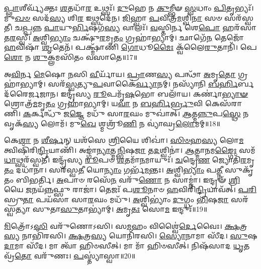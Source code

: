 \-\ul{𑌪𑍍𑌲𑌾}\-𑌶𑍀𑌰𑍍𑌵𑍍𑌯᳴𑌕𑍍𑌤𑌃 \ul{𑌶}\-𑌤𑌧𑌾᳴\-\ul{𑌰} 𑌉𑌥𑍍𑌸𑌃᳴।
\-\ul{𑌦𑍁}\-𑌹𑍇 𑌨 \ul{𑌕𑍁}\-𑌮𑍍𑌭𑍀𑍟 \ul{𑌸𑍍𑌵}\-𑌧𑌾𑌂 \ul{𑌪𑌿}\-𑌤𑍃𑌭𑍍𑌯𑌃᳴।
𑌮𑍁\-\ul{𑌖}\-\-\ul{𑍞} 𑌸𑌦᳴\-\ul{𑌸𑍍𑌯} 𑌶𑌿\-\ul{𑌰} 𑌇𑌥𑍍𑌸𑌦𑍇᳴𑌨।
\-\ul{𑌜𑌿}\-𑌹𑍍𑌵𑌾 \ul{𑌪}\-𑌵𑌿𑌤𑍍𑌰᳴\-\ul{𑌮}\-𑌶𑍍𑌵𑌿\-\ul{𑌨𑌾} 𑌸𑍞 𑌸𑌰᳴𑌸𑍍𑌵𑌤𑍀।
𑌚\-\ul{𑌪𑍍𑌪}\-𑌨𑍍𑌨 \ul{𑌪𑌾}\-𑌯𑍁\-\ul{𑌰𑍍𑌭𑌿}\-𑌷𑌗᳴\-\ul{𑌸𑍍𑌯} 𑌵𑌾𑌲𑌃᳴।
\-\ul{𑌵}\-𑌸𑍍𑌤𑌿𑌰𑍍𑌨 𑌶𑍇\-\ul{𑌪𑍋} 𑌹𑌰᳴𑌸𑌾 𑌤\-\ul{𑌰}\-𑌸𑍍𑌵𑍀।
\-\ul{𑌅}\-𑌶𑍍𑌵𑌿\-\ul{𑌭𑍍𑌯𑌾𑌂} 𑌚𑌕𑍍𑌷𑍁᳴\-\ul{𑌰}\-𑌮𑍃\-\ul{𑌤𑌂} 𑌗𑍍𑌰𑌹𑌾॑𑌭𑍍𑌯𑌾𑌮𑍍।
𑌛𑌾𑌗𑍇᳴\-\ul{𑌨} 𑌤𑍇𑌜𑍋᳴ \ul{𑌹}\-𑌵𑌿𑌷𑌾᳴ \ul{𑌶𑍃}\-𑌤𑍇𑌨᳴।
𑌪𑌕𑍍𑌷𑍍𑌮𑌾᳴𑌣𑌿 \ul{𑌗𑍋}\-𑌧𑍂\-\ul{𑌮𑍈𑌃} 𑌕𑍍𑌵᳴𑌲𑍈\-\ul{𑌰𑍁}\-𑌤𑌾𑌨𑌿᳴।
𑌪𑍇\-\ul{𑌶𑍋} 𑌨 \ul{𑌶𑍁}\-𑌕𑍍𑌲𑌮𑌸𑌿᳴𑌤𑌂 𑌵𑌸𑌾𑌤𑍇॥17॥

𑌅\-\ul{𑌵𑌿}\-𑌰𑍍𑌨 \ul{𑌮𑍇}\-𑌷𑍋 \ul{𑌨}\-𑌸𑌿 \ul{𑌵𑍀}\-𑌰𑍍𑌯𑌾᳴𑌯।
\-\ul{𑌪𑍍𑌰𑌾}\-𑌣\-\ul{𑌸𑍍𑌯} 𑌪𑌨𑍍𑌥𑌾᳴ \ul{𑌅}\-𑌮𑍃\-\ul{𑌤𑍋} 𑌗𑍍𑌰𑌹𑌾॑𑌭𑍍𑌯𑌾𑌮𑍍।
𑌸𑌰᳴\-\ul{𑌸𑍍𑌵}\-𑌤𑍍𑌯𑍁\-\ul{𑌪}\-𑌵𑌾𑌕𑍈॑\-\ul{𑌰𑍍𑌵𑍍𑌯𑌾}\-𑌨𑌮𑍍।
𑌨𑌸𑍍𑌯𑌾᳴𑌨𑌿 \ul{𑌬}\-\-\ul{𑌰𑍍}\-𑌹𑌿𑌰𑍍𑌬𑌦᳴𑌰𑍈𑌰𑍍𑌜𑌜𑌾𑌨।
𑌇𑌨𑍍𑌦𑍍𑌰᳴𑌸𑍍𑌯 \ul{𑌰𑍂}\-𑌪𑌮𑍃᳴\-\ul{𑌷}\-𑌭𑍋 𑌬𑌲𑌾᳴𑌯।
𑌕𑌰𑍍𑌣𑌾॑\-\ul{𑌭𑍍𑌯𑌾}\-\-\ul{𑍟} 𑌶𑍍𑌰𑍋𑌤𑍍𑌰᳴\-\ul{𑌮}\-𑌮𑍃\-\ul{𑌤𑌂} 𑌗𑍍𑌰𑌹𑌾॑𑌭𑍍𑌯𑌾𑌮𑍍।
𑌯\-\ul{𑌵𑌾} 𑌨 \ul{𑌬}\-\-\ul{𑌰𑍍}\-𑌹𑌿\-\ul{𑌰𑍍𑌭𑍍𑌰𑍁}\-𑌵𑌿 𑌕𑍇𑌸᳴𑌰𑌾𑌣𑌿।
\-\ul{𑌕}\-𑌰𑍍𑌕𑌨𑍍𑌧𑍁᳴ 𑌜\-\ul{𑌜𑍍𑌞𑍇} 𑌮𑌧𑍁᳴ 𑌸𑌾\-\ul{𑌰}\-𑌘𑌂 𑌮𑍁𑌖𑌾॑𑌤𑍍।
\-\ul{𑌆}\-𑌤𑍍𑌮\-\ul{𑌨𑍍𑌨𑍁}\-𑌪\-\ul{𑌸𑍍𑌥𑍇} 𑌨 𑌵𑍃𑌕᳴\-\ul{𑌸𑍍𑌯} 𑌲𑍋𑌮᳴।
𑌮𑍁\-\ul{𑌖𑍇} 𑌶𑍍𑌮𑌶𑍍𑌰𑍂᳴\-\ul{𑌣𑌿} 𑌨 𑌵𑍍𑌯𑌾॑𑌘𑍍𑌰\-\ul{𑌲𑍋}\-𑌮𑌮𑍍॥18॥

𑌕𑍇\-\ul{𑌶𑌾} 𑌨 \ul{𑌶𑍀}\-\-\ul{𑌰𑍍}\-𑌷𑌨𑍍‌ 𑌯𑌶᳴𑌸𑍇 \ul{𑌶𑍍𑌰𑌿}\-𑌯𑍈 𑌶𑌿𑌖𑌾॑।
\-\ul{𑌸𑌿}\-\-\ul{𑍞}\-𑌹\-\ul{𑌸𑍍𑌯} 𑌲𑍋\-\ul{𑌮} 𑌤𑍍𑌵𑌿𑌷𑌿᳴𑌰𑌿\-\ul{𑌨𑍍𑌦𑍍𑌰𑌿}\-𑌯𑌾𑌣𑌿᳴।
𑌅𑌙𑍍𑌗𑌾॑\-\ul{𑌨𑍍𑌯𑌾}\-𑌤𑍍𑌮\-\ul{𑌨𑍍𑌭𑌿}\-𑌷\-\ul{𑌜𑌾} 𑌤\-\ul{𑌦}\-𑌶𑍍𑌵𑌿𑌨𑌾॑।
\-\ul{𑌆}\-𑌤𑍍𑌮𑌾\-\ul{𑌨}\-𑌮\-\ul{𑌙𑍍𑌗𑍈𑌃} 𑌸𑌮᳴\-\ul{𑌧𑌾}\-𑌥𑍍𑌸𑌰᳴𑌸𑍍𑌵𑌤𑍀।
𑌇𑌨𑍍𑌦𑍍𑌰᳴𑌸𑍍𑌯 \ul{𑌰𑍂}\-𑌪𑍞 \ul{𑌶}\-𑌤𑌮𑌾᳴\-\ul{𑌨}\-𑌮𑌾𑌯𑍁𑌃᳴।
\-\ul{𑌚}\-𑌨𑍍𑌦𑍍𑌰𑍇\-\ul{𑌣} 𑌜𑍍𑌯𑍋𑌤𑌿᳴\-\ul{𑌰}\-𑌮𑍃\-\ul{𑌤𑌂} 𑌦𑌧𑌾᳴𑌨𑌾।
𑌸𑌰᳴𑌸𑍍𑌵\-\ul{𑌤𑍀} 𑌯𑍋\-\ul{𑌨𑍍𑌯𑌾𑌂} 𑌗𑌰𑍍𑌭᳴\-\ul{𑌮}\-𑌨𑍍𑌤𑌃।
\-\ul{𑌅}\-𑌶𑍍𑌵𑌿\-\ul{𑌭𑍍𑌯𑌾𑌂} 𑌪\-\ul{𑌤𑍍𑌨𑍀} 𑌸𑍁𑌕𑍃᳴𑌤𑌂 𑌬𑌿𑌭𑌰𑍍𑌤𑌿।
\-\ul{𑌅}\-𑌪𑌾𑍞 𑌰𑌸𑍇᳴\-\ul{𑌨} 𑌵𑌰𑍁᳴\-\ul{𑌣𑍋} 𑌨 𑌸𑌾𑌮𑍍𑌨𑌾॑।
𑌇𑌨𑍍𑌦𑍍𑌰𑍟᳴ \ul{𑌶𑍍𑌰𑌿}\-𑌯𑍈 \ul{𑌜}\-𑌨𑌯᳴\-\ul{𑌨𑍍𑌨}\-𑌫𑍍𑌸𑍁 𑌰𑌾𑌜𑌾॑।
𑌤𑍇𑌜𑌃᳴ 𑌪\-\ul{𑌶𑍂}\-𑌨𑌾𑍞 \ul{𑌹}\-𑌵𑌿𑌰𑌿᳴\-\ul{𑌨𑍍𑌦𑍍𑌰𑌿}\-𑌯𑌾𑌵᳴𑌤𑍍।
\-\ul{𑌪}\-\-\ul{𑌰𑌿}\-𑌸𑍍𑌰𑍁\-\ul{𑌤𑌾} 𑌪𑌯᳴𑌸𑌾 𑌸𑌾\-\ul{𑌰}\-𑌘𑌂 𑌮𑌧𑍁᳴।
\-\ul{𑌅}\-𑌶𑍍𑌵𑌿𑌭𑍍𑌯𑌾𑌂॑ \ul{𑌦𑍁}\-𑌗𑍍𑌧𑌂 \ul{𑌭𑌿}\-𑌷\-\ul{𑌜𑌾} 𑌸𑌰᳴𑌸𑍍𑌵𑌤𑍍𑌯𑌾 𑌸𑍁𑌤𑌾\-\ul{𑌸𑍁}\-𑌤𑌾𑌭𑍍𑌯𑌾॑𑌮𑍍।
\-\ul{𑌅}\-𑌮𑍃\-\ul{𑌤𑌃} 𑌸𑍋\-\ul{𑌮} 𑌇𑌨𑍍𑌦𑍁𑌃᳴॥19॥\anuvakamend[𑌅𑌨𑍍𑌤᳴𑌰 \ul{𑌆}\-𑌰𑌾\-\ul{𑌦}\-𑌨𑍍𑌤𑌰𑍍𑌵᳴𑌸𑌾𑌤𑍇 𑌵𑍍𑌯𑌾𑌘𑍍𑌰\-\ul{𑌲𑍋}\-𑌮𑍞 𑌰𑌾𑌜𑌾᳴ \ul{𑌚}\-𑌤𑍍𑌵𑌾𑌰𑌿᳴ 𑌚]

\-\ul{𑌮𑌿}\-𑌤𑍍𑌰𑍋᳴𑌽\-\ul{𑌸𑌿} 𑌵𑌰𑍁᳴𑌣𑍋𑌽𑌸𑌿।
𑌸\-\ul{𑌮}\-𑌹𑌂 𑌵𑌿𑌶𑍍𑌵𑍈॑\-\ul{𑌰𑍍𑌦𑍇}\-𑌵𑍈𑌃।
\-\ul{𑌕𑍍𑌷}\-𑌤𑍍𑌰\-\ul{𑌸𑍍𑌯} 𑌨𑌾𑌭𑌿᳴𑌰𑌸𑌿।
\-\ul{𑌕𑍍𑌷}\-𑌤𑍍𑌰\-\ul{𑌸𑍍𑌯} 𑌯𑍋𑌨𑌿᳴𑌰𑌸𑌿।
\-\ul{𑌸𑍍𑌯𑍋}\-𑌨𑌾𑌮𑌾 𑌸𑍀᳴𑌦।
\-\ul{𑌸𑍁}\-𑌷\-\ul{𑌦𑌾}\-𑌮𑌾 𑌸𑍀᳴𑌦।
𑌮𑌾 𑌤𑍍𑌵𑌾᳴ 𑌹𑌿𑍞𑌸𑍀𑌤𑍍।
𑌮𑌾 𑌮𑌾᳴ 𑌹𑌿𑍞𑌸𑍀𑌤𑍍।
𑌨𑌿𑌷᳴𑌸𑌾𑌦 \ul{𑌧𑍃}\-𑌤𑌵𑍍𑌰᳴\-\ul{𑌤𑍋} 𑌵𑌰𑍁᳴𑌣𑌃।
\-\ul{𑌪}\-𑌸𑍍𑌤𑍍𑌯𑌾॑𑌸𑍍𑌵𑌾॥20॥

